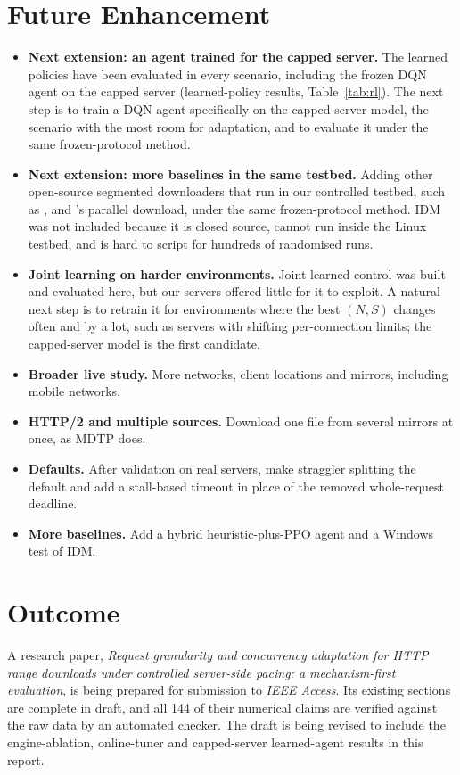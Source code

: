 \chapter{Future Enhancement}
\begin{itemize}
\item \textbf{Next extension: an agent trained for the capped server.} The learned policies have been evaluated in every scenario, including the frozen DQN agent on the capped server (learned-policy results, Table~\ref{tab:rl}). The next step is to train a DQN agent specifically on the capped-server model, the scenario with the most room for adaptation, and to evaluate it under the same frozen-protocol method.
\item \textbf{Next extension: more baselines in the same testbed.} Adding other open-source segmented downloaders that run in our controlled testbed, such as ,  and 's parallel download, under the same frozen-protocol method. IDM was not included because it is closed source, cannot run inside the Linux testbed, and is hard to script for hundreds of randomised runs.
\item \textbf{Joint learning on harder environments.} Joint learned control was built and evaluated here, but our servers offered little for it to exploit. A natural next step is to retrain it for environments where the best $(N, S)$ changes often and by a lot, such as servers with shifting per-connection limits; the capped-server model is the first candidate.
\item \textbf{Broader live study.} More networks, client locations and mirrors, including mobile networks.
\item \textbf{HTTP/2 and multiple sources.} Download one file from several mirrors at once, as MDTP does.
\item \textbf{Defaults.} After validation on real servers, make straggler splitting the default and add a stall-based timeout in place of the removed whole-request deadline.
\item \textbf{More baselines.} Add a hybrid heuristic-plus-PPO agent and a Windows test of IDM.
\end{itemize}

\chapter{Outcome}
A research paper, \emph{Request granularity and concurrency adaptation for HTTP range downloads under controlled server-side pacing: a mechanism-first evaluation}, is being prepared for submission to \emph{IEEE Access}. Its existing sections are complete in draft, and all 144 of their numerical claims are verified against the raw data by an automated checker. The draft is being revised to include the engine-ablation, online-tuner and capped-server learned-agent results in this report.

